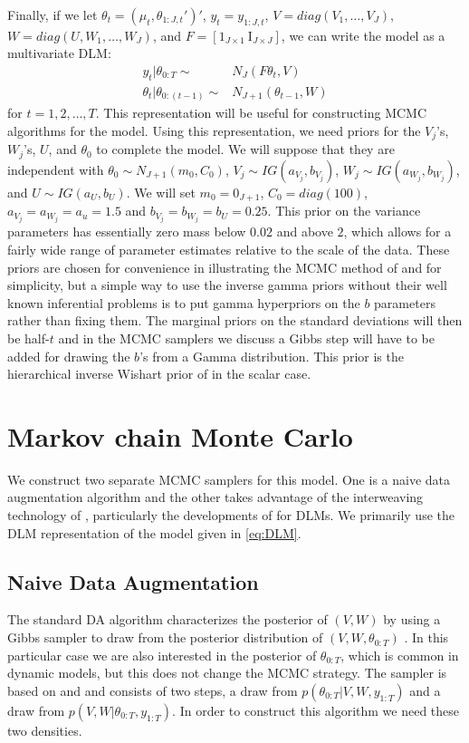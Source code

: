 \documentclass[graybox]{svmult}
\begin{document}
Finally, if we let $\theta_t=(\mu_t,\theta_{1:J,t}')'$, $y_t=y_{1:J,t}$, $V=diag(V_1,\dots,V_J)$, $W=diag(U,W_1,\dots,W_J)$, and $F=[1_{J\times 1}\  \mathrm{I}_{J\times J}]$, we can write the model as a multivariate DLM:
\begin{align}
y_t|\theta_{0:T}\sim&N_J(F\theta_t,V)\nonumber\\
\theta_t|\theta_{0:(t-1)}\sim&N_{J+1}(\theta_{t-1},W)\label{eq:DLM}
\end{align}
for $t=1,2,\dots,T$. This representation will be useful for constructing MCMC algorithms for the model. Using this representation, we need priors for the $V_j$'s, $W_j$'s, $U$, and $\theta_0$ to complete the model. We will suppose that they are independent with $\theta_0\sim N_{J+1}(m_0,C_0)$, $V_j\sim IG(a_{V_j},b_{V_j})$, $W_j\sim IG(a_{W_j},b_{W_j})$, and $U\sim IG(a_U,b_U)$. We will set $m_0=0_{J+1}$, $C_0=diag(100)$, $a_{V_j}=a_{W_j}=a_u=1.5$ and $b_{V_j}=b_{W_j}=b_U=0.25$. This prior on the variance parameters has essentially zero mass below $0.02$ and above $2$, which allows for a fairly wide range of parameter estimates relative to the scale of the data. These priors are chosen for convenience in illustrating the MCMC method of \cite{simpson2014interweaving} and for simplicity, but a simple way to use the inverse gamma priors without their well known inferential problems \citep{gelman2006prior} is to put gamma hyperpriors on the $b$ parameters rather than fixing them. The marginal priors on the standard deviations will then be half-$t$ and in the MCMC samplers we discuss a Gibbs step will have to be added for drawing the $b$'s from a Gamma distribution. This prior is the hierarchical inverse Wishart prior of \cite{huang2013simple} in the scalar case.


\section{Markov chain Monte Carlo}\label{sec:MCMC}
 We construct two separate MCMC samplers for this model. One is a naive data augmentation algorithm and the other takes advantage of the interweaving technology of \cite{yu2011center}, particularly the developments of \cite{simpson2014interweaving} for DLMs. We primarily use the DLM representation of the model given in \eqref{eq:DLM}. 

\subsection{Naive Data Augmentation}\label{sec:gibbs}
The standard DA algorithm characterizes the posterior of $(V,W)$ by using a Gibbs sampler to draw from the posterior distribution of $(V,W,\theta_{0:T})$ \citep{tanner1987calculation}. In this particular case we are also interested in the posterior of $\theta_{0:T}$, which is common in dynamic models, but this does not change the MCMC strategy. The sampler is based on \cite{fruhwirth1994data} and \cite{carter1994gibbs} and consists of two steps, a draw from $p(\theta_{0:T}|V,W,y_{1:T})$ and a draw from $p(V,W|\theta_{0:T},y_{1:T})$. In order to construct this algorithm we need these two densities.
\end{document}
